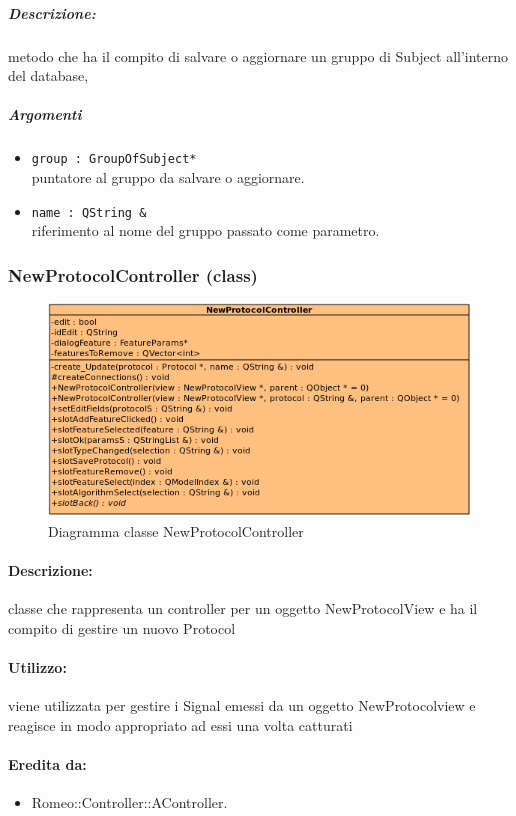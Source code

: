 \begin{itemize}
			\subparagraph{Descrizione:} metodo che ha il compito di salvare o aggiornare un gruppo di Subject\g{} all'interno del database,
			\color{black}
			\subparagraph{Argomenti}
			\begin{itemize}
				\item \color{RoyalPurple} \verb!group : GroupOfSubject*!\\				
\color{black} puntatore al gruppo da salvare o aggiornare.
				\item \color{RoyalPurple} \verb!name : QString &!\\				
\color{black} riferimento al nome del gruppo passato come parametro.
			\end{itemize}
		\end{itemize}
	\subsubsection{NewProtocolController (class)}
	\begin{figure}[!h]
		\centering
		\includegraphics[scale=2.75]{./Content/Immagini/controller/NewProtocolController.png}
		\caption{Diagramma classe NewProtocolController}
	\end{figure}
	\paragraph{Descrizione:} classe che rappresenta un controller per un oggetto NewProtocolView e ha il compito di gestire un nuovo Protocol\g{}
	\paragraph{Utilizzo:} viene utilizzata per gestire i Signal\g{} emessi da un oggetto NewProtocolview e reagisce in modo appropriato ad essi una volta catturati
	\paragraph{Eredita da:}
		\begin{itemize}
			\item Romeo::Controller::AController.
		\end{itemize}
